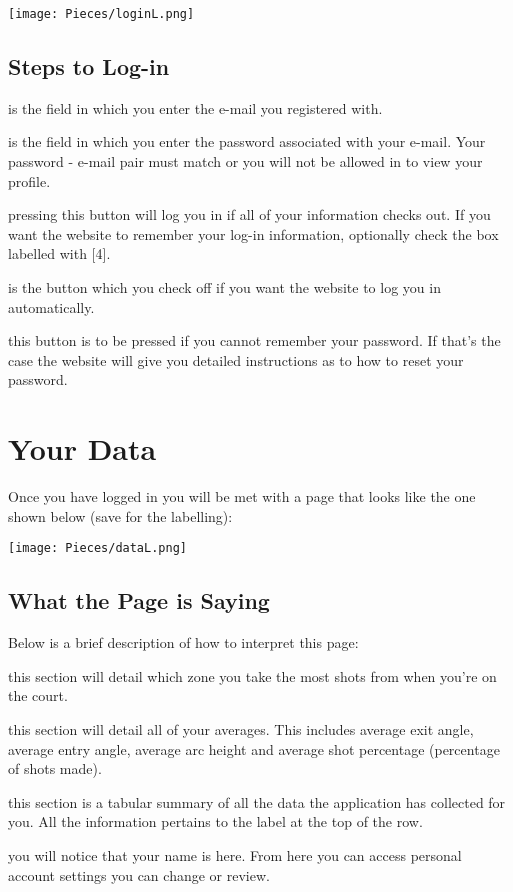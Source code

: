 \begin{center}
    \texttt{[image: Pieces/loginL.png]}
\end{center}

\subsection{Steps to Log-in}
\begin{enumerate}[{[1]}]
\item is the field in which you enter the e-mail you registered with.
\item is the field in which you enter the password associated with your e-mail. Your password - e-mail pair must match or you will not be allowed in to view your profile.
\item pressing this button will log you in if all of your information checks out. If you want the website to remember your log-in information, optionally check the box labelled with [4].
\item is the button which you check off if you want the website to log you in automatically.
\item this button is to be pressed if you cannot remember your password. If that's the case the website will give you detailed instructions as to how to reset your password.
\end{enumerate}

\section{Your Data}
Once you have logged in you will be met with a page that looks like the one shown below (save for the labelling):

\begin{center}
    \texttt{[image: Pieces/dataL.png]}
\end{center}

\subsection{What the Page is Saying}
Below is a brief description of how to interpret this page:

\begin{enumerate}[{[1]}]
\item this section will detail which zone you take the most shots from when you're on the court.
\item this section will detail all of your averages. This includes average exit angle, average entry angle, average arc height and average shot percentage (percentage of shots made).
\item this section is a tabular summary of all the data the application has collected for you. All the information pertains to the label at the top of the row.
\item you will notice that your name is here. From here you can access personal account settings you can change or review.
\end{enumerate}